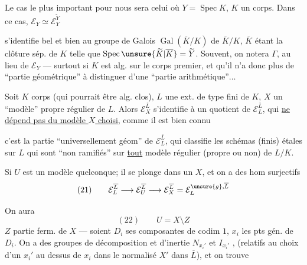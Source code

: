 
Le cas le plus important pour nous sera celui où $Y=\operatorname{Spec}K$, $K$ un corps.  Dans ce cas, $\mathcal E_Y\simeq\mathcal E_Y^{\widetilde Y}$


s'identifie bel et bien au groupe de Galois $\operatorname{Gal}(\overline K/K)$ de  $\overline K/K$, $\overline K$ étant la clôture sép. de $K$ telle que $\operatorname{Spec}\unsure{\widetilde K|\overline K}=\widetilde Y$. Souvent, on notera $\Gamma$,  au lieu de $\mathcal E_Y$ --- surtout si $K$ est alg. sur le corps premier, et qu'il n'a donc plus de ``partie géométrique'' à distinguer d'une ``partie arithmétique''$\ldots$

Soit  $K$  corps (qui pourrait être alg. clos), $L$ une ext. de type fini de $K$, $X$ un ``modèle'' propre régulier de $L$. Alors $\mathcal E_X^{\overline L}$ s'identifie à un quotient de $\mathcal E_L^{\overline L}$, qui \uline{ne  dépend pas du modèle $X$ choisi}, comme il est bien connu


c'est la partie ``universellement géom'' de $\mathcal E_L^{\overline L}$,    qui classifie les schémas (finis) étales sur $L$ qui sont ``non ramifiés'' sur \uline{tout} modèle  régulier (propre ou non) de $L/K$.


Si $U$ est un modèle quelconque; il se plonge dans un $X$, et on a des hom surjectifs
\[
(21)\qquad \mathcal E_L^{\overline L}\longrightarrow\mathcal E_U^{\overline L}\longrightarrow\mathcal E_X^{\overline L}=\mathcal E_L^{\unsure{g},\overline L}
\]

On aura 
\[
(22)\qquad U=X\setminus Z
\]
$Z$ partie ferm. de $X$ --- soient $D_i$ ses composantes de codim $1$, $x_i$ les pts gén. de $D_i$. On a des groupes de décomposition et d'inertie $N_{x_i'}$ et $I_{x_i'}$ , (relatifs au choix d'un $x_i'$ au dessus de $x_i$ dans le normalisé $X'$ dans $\overline L$), et on trouve

